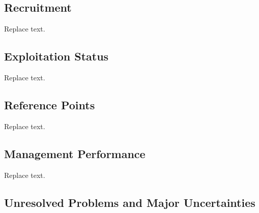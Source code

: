 \documentclass[11pt,
  english,
  a4paper,
]{article}
\begin{document}
\hypertarget{recruitment}{%
\subsection*{Recruitment}\label{recruitment}}

\leavevmode\tagmcend\tagstructend

Replace text.


\hypertarget{exploitation-status}{%
\subsection*{Exploitation Status}\label{exploitation-status}}

\leavevmode\tagmcend\tagstructend

Replace text.


\hypertarget{reference-points}{%
\subsection*{Reference Points}\label{reference-points}}

\leavevmode\tagmcend\tagstructend

Replace text.


\hypertarget{management-performance}{%
\subsection*{Management Performance}\label{management-performance}}

\leavevmode\tagmcend\tagstructend

Replace text.


\hypertarget{unresolved-problems-and-major-uncertainties}{%
\subsection*{Unresolved Problems and Major Uncertainties}\label{unresolved-problems-and-major-uncertainties}}
\end{document}
